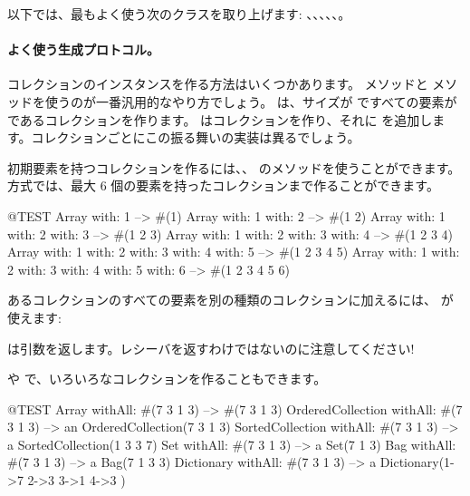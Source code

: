 \documentclass[a4paper,10pt,twoside]{book}
\begin{document}
以下では、最もよく使う次のクラスを取り上げます: 、、、、、。

\paragraph{よく使う生成プロトコル。}
コレクションのインスタンスを作る方法はいくつかあります。 メソッドと  メソッドを使うのが一番汎用的なやり方でしょう。 は、サイズが  ですべての要素が  であるコレクションを作ります。  はコレクションを作り、それに  を追加します。コレクションごとにこの振る舞いの実装は異るでしょう。

初期要素を持つコレクションを作るには、、 \etc のメソッドを使うことができます。 方式では、最大 6 個の要素を持ったコレクションまで作ることができます。

\begin{code}{@TEST}
Array with: 1 --> #(1)
Array with: 1 with: 2 --> #(1 2)
Array with: 1 with: 2 with: 3 --> #(1 2 3)
Array with: 1 with: 2 with: 3 with: 4 --> #(1 2 3 4)
Array with: 1 with: 2 with: 3 with: 4 with: 5 --> #(1 2 3 4 5)
Array with: 1 with: 2 with: 3 with: 4 with: 5 with: 6 --> #(1 2 3 4 5 6)
\end{code}

あるコレクションのすべての要素を別の種類のコレクションに加えるには、 が使えます:

\noindent
{} は引数を返します。レシーバを返すわけではないのに注意してください!

 や  で、いろいろなコレクションを作ることもできます。

\begin{code}{@TEST}
Array withAll: #(7 3 1 3)                      --> #(7 3 1 3)
OrderedCollection withAll: #(7 3 1 3) --> an OrderedCollection(7 3 1 3)
SortedCollection withAll: #(7 3 1 3)    --> a SortedCollection(1 3 3 7)
Set withAll: #(7 3 1 3)                         --> a Set(7 1 3)
Bag withAll: #(7 3 1 3)                        --> a Bag(7 1 3 3)
Dictionary withAll: #(7 3 1 3)               --> a Dictionary(1->7 2->3 3->1 4->3 )
\end{code}
\end{document}
